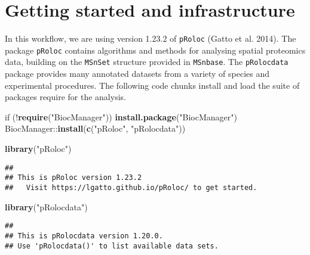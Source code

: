 \documentclass[]{article}
\newenvironment{Shaded}{\begin{snugshade}}{\end{snugshade}}
\newcommand{\KeywordTok}[1]{\textcolor[rgb]{0.13,0.29,0.53}{\textbf{{#1}}}}
\newcommand{\StringTok}[1]{\textcolor[rgb]{0.31,0.60,0.02}{{#1}}}
\newcommand{\NormalTok}[1]{{#1}}
\begin{document}
\section{Getting started and
infrastructure}\label{getting-started-and-infrastructure}

In this workflow, we are using version 1.23.2 of \texttt{pRoloc} (Gatto
et al. 2014). The package \texttt{pRoloc} contains algorithms and
methods for analysing spatial proteomics data, building on the
\texttt{MSnSet} structure provided in \texttt{MSnbase}. The
\texttt{pRolocdata} package provides many annotated datasets from a
variety of species and experimental procedures. The following code
chunks install and load the suite of packages require for the analysis.

\begin{Shaded}
\begin{Highlighting}[]
\NormalTok{if (!}\KeywordTok{require}\NormalTok{(}\StringTok{"BiocManager"}\NormalTok{))}
    \KeywordTok{install.package}\NormalTok{(}\StringTok{"BiocManager"}\NormalTok{)}
\NormalTok{BiocManager::}\KeywordTok{install}\NormalTok{(}\KeywordTok{c}\NormalTok{(}\StringTok{"pRoloc"}\NormalTok{, }\StringTok{"pRolocdata"}\NormalTok{))}
\end{Highlighting}
\end{Shaded}

\begin{Shaded}
\begin{Highlighting}[]
\KeywordTok{library}\NormalTok{(}\StringTok{"pRoloc"}\NormalTok{)}
\end{Highlighting}
\end{Shaded}

\begin{verbatim}
## 
## This is pRoloc version 1.23.2 
##   Visit https://lgatto.github.io/pRoloc/ to get started.
\end{verbatim}

\begin{Shaded}
\begin{Highlighting}[]
\KeywordTok{library}\NormalTok{(}\StringTok{"pRolocdata"}\NormalTok{)}
\end{Highlighting}
\end{Shaded}

\begin{verbatim}
## 
## This is pRolocdata version 1.20.0.
## Use 'pRolocdata()' to list available data sets.
\end{verbatim}
\end{document}
